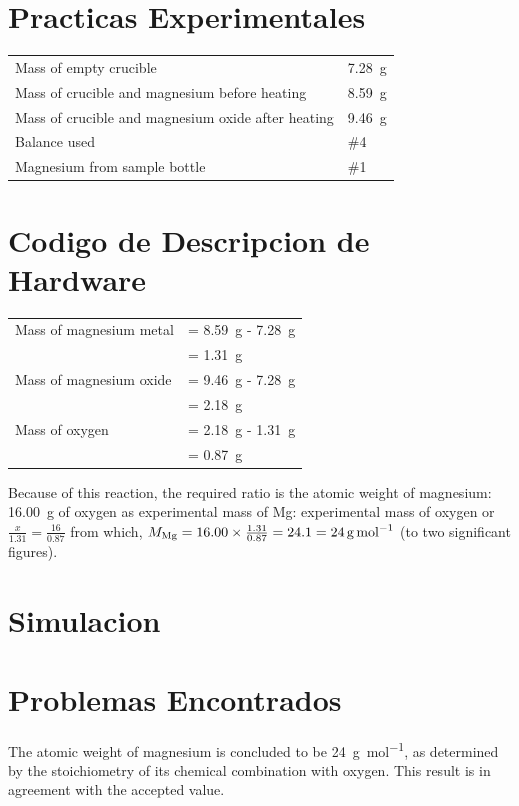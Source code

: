 \documentclass{article}
\begin{document}
\section{Practicas Experimentales}
\begin{tabular}{ll}
Mass of empty crucible & \SI{7.28}{\gram}\\
Mass of crucible and magnesium before heating & \SI{8.59}{\gram}\\
Mass of crucible and magnesium oxide after heating & \SI{9.46}{\gram}\\
Balance used & \#4\\
Magnesium from sample bottle & \#1
\end{tabular}
\section{Codigo de Descripcion de Hardware}
\begin{tabular}{ll}
Mass of magnesium metal & = \SI{8.59}{\gram} - \SI{7.28}{\gram}\\
& = \SI{1.31}{\gram}\\
Mass of magnesium oxide & = \SI{9.46}{\gram} - \SI{7.28}{\gram}\\
& = \SI{2.18}{\gram}\\
Mass of oxygen & = \SI{2.18}{\gram} - \SI{1.31}{\gram}\\
& = \SI{0.87}{\gram}
\end{tabular}

Because of this reaction, the required ratio is the atomic weight of magnesium: \SI{16.00}{\gram} of oxygen as experimental mass of Mg: experimental mass of oxygen or $\frac{x}{1.31}=\frac{16}{0.87}$ from which, $M_{\ce{Mg}} = 16.00 \times \frac{1.31}{0.87} = 24.1 = \SI{24}{\gram\per\mole}$ (to two significant figures).

\section{Simulacion}
\section{Problemas Encontrados}
The atomic weight of magnesium is concluded to be \SI{24}{\gram\per\mol}, as determined by the stoichiometry of its chemical combination with oxygen. This result is in agreement with the accepted value.
\end{document}

